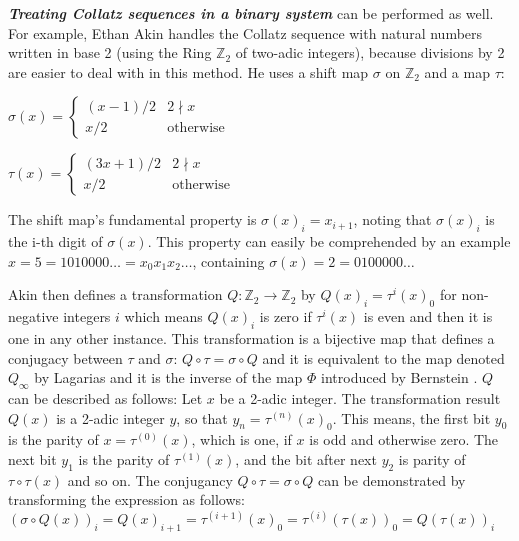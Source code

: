 \par\medskip
\textit{\textbf{Treating Collatz sequences in a binary system}} can be performed as well. For example, Ethan Akin \cite{Ref_Akin_2004} handles the Collatz sequence with natural numbers written in base 2 (using the Ring $\mathbb{Z}_2$ of two-adic integers), because divisions by 2 are easier to deal with in this method. He uses a shift map $\sigma$ on $\mathbb{Z}_2$ and a map $\tau$:

\begin{table}[H]
	\centering
	\parbox{.45\linewidth}{
		$\sigma(x)=
		\begin{cases}
		(x-1)/2		&	2\nmid x\\
		x/2			&	\text{otherwise}
		\end{cases}$
	}
	\parbox[][][b]{.45\linewidth}{
		$\tau(x)=
		\begin{cases}
		(3x+1)/2	&	2\nmid x\\
		x/2			&	\text{otherwise}
		\end{cases}$
	}
\end{table}

The shift map's fundamental property is $\sigma(x)_i=x_{i+1}$, noting that $\sigma(x)_i$ is the i-th digit of $\sigma(x)$. This property can easily be comprehended by an example $x=5=1010000\ldots=x_0x_1x_2\ldots$, containing $\sigma(x)=2=0100000\ldots$

\par\medskip
Akin then defines a transformation $Q:\mathbb{Z}_2\rightarrow\mathbb{Z}_2$ by $Q(x)_i=\tau^i(x)_0$ for non-negative integers $i$ which means $Q(x)_i$ is zero if $\tau^i(x)$ is even and then it is one in any other instance. This transformation is a bijective map that defines a conjugacy between $\tau$ and $\sigma$: $Q\circ\tau=\sigma\circ Q$ and it is equivalent to the map denoted $Q_\infty$ by Lagarias \cite{Ref_Lagarias_1985} and it is the inverse of the map $\Phi$ introduced by Bernstein \cite{Ref_Bernstein_Lagarias_1996}. $Q$ can be described as follows: Let $x$ be a 2-adic integer. The transformation result $Q(x)$ is a 2-adic integer $y$, so that $y_n=\tau^{(n)}(x)_0$. This means, the first bit $y_0$ is the parity of $x=\tau^{(0)}(x)$, which is one, if $x$ is odd and otherwise zero. The next bit $y_1$ is the parity of $\tau^{(1)}(x)$, and the bit after next $y_2$ is parity of $\tau\circ\tau(x)$ and so on. The conjugancy $Q\circ\tau=\sigma\circ Q$ can be demonstrated by transforming the expression as follows: $(\sigma\circ Q(x))_i=Q(x)_{i+1}=\tau^{(i+1)}(x)_0=\tau^{(i)}(\tau(x))_0=Q(\tau(x))_i$


